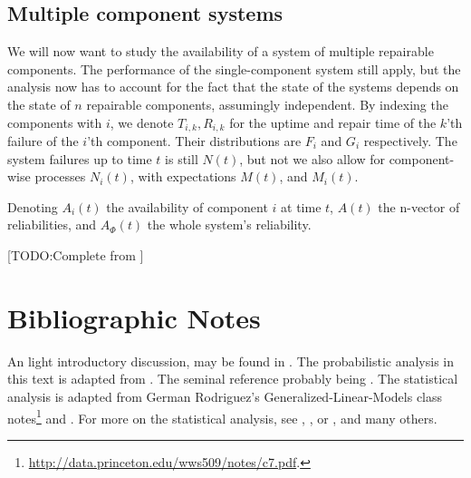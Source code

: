 \subsection{Multiple component systems}
We will now want to study the availability of a system of multiple repairable components.
The performance of the single-component system still apply, but the analysis now has to account for the fact that the state of the systems depends on the state of $n$ repairable components, assumingly independent.
By indexing the components with $i$, we denote $T_{i,k}, R_{i,k}$ for the uptime and repair time of the $k$'th failure of the $i$'th component. Their distributions are $F_i$ and $G_i$ respectively.
The system failures up to time $t$ is still $N(t)$, but not we also allow for component-wise processes $N_i(t)$, with expectations $M(t)$, and $M_i(t)$.

Denoting $A_i(t)$ the availability of component $i$ at time $t$, $A(t)$ the n-vector of reliabilities, and $A_\Phi(t)$ the whole system's reliability. 

[TODO:Complete from  \cite[Sec.4.3]{aven_stochastic_1999}]



\section{Bibliographic Notes}
An light introductory discussion, may be found in \cite{nahmias_production_2015}. 
The probabilistic analysis in this text is adapted from \cite{aven_stochastic_1999}.
The seminal reference probably being \cite{barlow_mathematical_1965}.
The statistical analysis is adapted from German Rodriguez's Generalized-Linear-Models class notes\footnote{\url{http://data.princeton.edu/wws509/notes/c7.pdf}.} and \cite[Ch.8]{natrella_nist/sematech_2010}.
For more on the statistical analysis, see \cite{cox_analysis_1984}, \cite{kalbfleisch_statistical_2002}, or \cite{klein_survival_2005}, and many others. 


% 